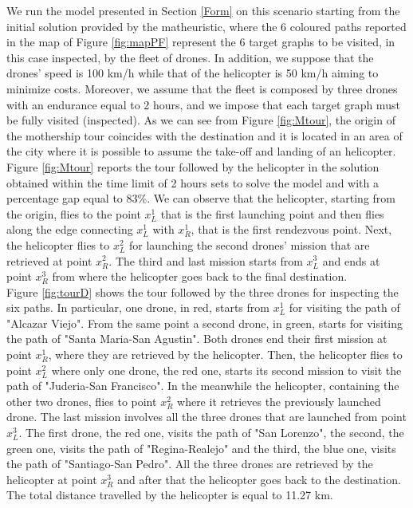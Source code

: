 \noindent
We run the model presented in Section \ref{Form} on this scenario starting from the initial solution provided by the matheuristic, where the 6 coloured paths reported in the map of Figure \ref{fig:mapPF} represent the 6 target graphs to be visited, in this case inspected, by the fleet of drones. In addition, we suppose that the drones' speed is 100 km/h while that of the helicopter is  50 km/h aiming to minimize costs.
Moreover, we assume that the fleet is composed by three drones with an endurance equal to 2 hours, and we impose that each target graph must be fully visited (inspected).  As we can see from Figure \ref{fig:Mtour}, the origin of the mothership tour coincides with the destination and it is located in an area of the city where it is possible to assume the take-off and landing of an helicopter. Figure \ref{fig:Mtour} reports the tour followed by the helicopter in the solution obtained within the time limit of 2 hours sets to solve the model and with a percentage gap equal to 83\%. We can observe that the helicopter, starting from the origin, flies to the point $x_L^1$ that is the first launching point and then flies along the edge connecting $x_L^1$ with $x_R^1$, that is the first rendezvous point. Next, the helicopter flies to $x_L^2$ for launching the second drones' mission that are retrieved at point $x_R^2$. The third and last mission starts from $x_L^3$ and ends at point $x_R^3$ from where the helicopter goes back to the final destination.\\
Figure \ref{fig:tourD} shows the tour followed by the three drones for inspecting the six paths. In particular, one drone, in red, starts from $x_L^1$ for visiting the path of "Alcazar Viejo". From the same point a second drone, in green, starts for visiting the path of "Santa Maria-San Agustin". Both drones end their first mission at point $x_R^1$, where they are retrieved by the helicopter. Then, the helicopter flies to point $x_L^2$ where only one drone, the red one, starts its second mission to visit the path of "Juderia-San Francisco". In the meanwhile the helicopter, containing the other two drones, flies to point $x_R^2$ where it retrieves the previously launched drone. The last mission involves all the three drones that are launched from point $x_L^3$. The first drone, the red one, visits the path of "San Lorenzo", the second, the green one, visits the path of "Regina-Realejo" and the third, the blue one, visits the path of "Santiago-San Pedro".
All the three drones are retrieved by the helicopter at point $x_R^3$ and after that the helicopter goes back to the destination. 
The total distance travelled by the helicopter is equal to 11.27 km.

